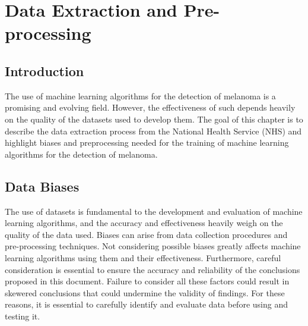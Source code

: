 \chapter{Data Extraction and Pre-processing}

\section{Introduction}
The use of machine learning algorithms for the detection of melanoma is a promising and evolving field. However, the effectiveness of such depends heavily on the quality of the datasets used to develop them. The goal of this chapter is to describe the data extraction process from the National Health Service (NHS) and highlight biases and preprocessing needed for the training of machine learning algorithms for the detection of melanoma.  

\section{Data Biases}
The use of datasets is fundamental to the development and evaluation of machine learning algorithms, and the accuracy and effectiveness heavily weigh on the quality of the data used. Biases can arise from data collection procedures and pre-processing techniques. Not considering possible biases greatly affects machine learning algorithms using them and their effectiveness. Furthermore, careful consideration is essential to ensure the accuracy and reliability of the conclusions proposed in this document. Failure to consider all these factors could result in skewered conclusions that could undermine the validity of findings. For these reasons, it is essential to carefully identify and evaluate data before using and testing it.

